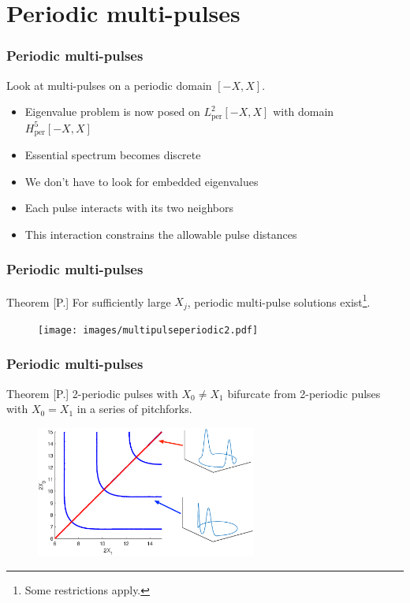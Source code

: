 \documentclass[16pt]{beamer}
\begin{document}
\section{Periodic multi-pulses}

\begin{frame}
	\frametitle{Periodic multi-pulses}
	\fontsize{16}{7.2}\selectfont
	Look at multi-pulses on a periodic domain $[-X,X]$.
	\begin{itemize}
		\item Eigenvalue problem is now posed on $L^2_{\text{per}}[-X, X]$ with domain $H^5_{\text{per}}[-X, X]$
		\vspace{0.25cm}
		\item Essential spectrum becomes discrete
		\vspace{0.25cm}
		\item We don't have to look for embedded eigenvalues
		\vspace{0.25cm}
		\item Each pulse interacts with its two neighbors
		\vspace{0.25cm}
		\item This interaction constrains the allowable pulse distances
	\end{itemize}
\end{frame}

\begin{frame}
\frametitle{Periodic multi-pulses} 
	\fontsize{14}{7.2}\selectfont
    \begin{block}{Theorem [P.]}
    For sufficiently large $X_j$, periodic multi-pulse solutions exist\footnote{Some restrictions apply.}.

	\begin{figure}
	\begin{center}
	\texttt{[image: images/multipulseperiodic2.pdf]}
	\end{center}
	\end{figure}
    \end{block}
\end{frame}

\begin{frame}
\frametitle{Periodic multi-pulses} 
	\fontsize{14}{7.2}\selectfont
    \begin{block}{Theorem [P.]}
    2-periodic pulses with $X_0 \neq X_1$ bifurcate from 2-periodic pulses with $X_0 = X_1$ in a series of pitchforks.

	\begin{figure}
	\begin{center}
	\includegraphics[width=7.25cm]{images/periodicpitchforklabeled}
	\end{center}
	\end{figure}
    \end{block}
\end{frame}
\end{document}
